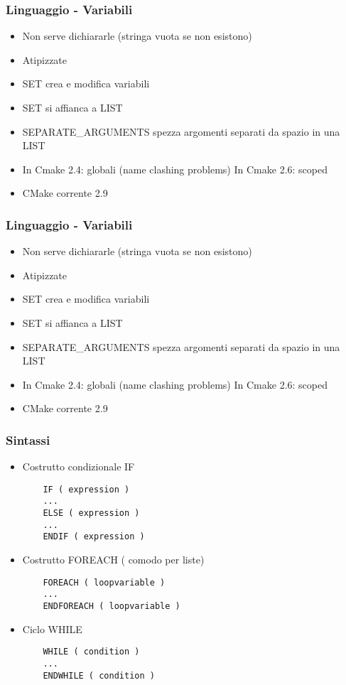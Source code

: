 \documentclass[12pt] {beamer}
\begin{document}
\begin{frame}
	\frametitle{Linguaggio - Variabili}
	\begin{itemize}
		\item Non serve dichiararle (stringa vuota se non esistono)
		\item Atipizzate
		\item SET crea e modifica variabili
		\item SET si affianca a LIST
		\item SEPARATE\_ARGUMENTS spezza argomenti separati da spazio in una LIST
		\item In Cmake 2.4: globali (name clashing problems)  In Cmake 2.6: scoped
		\item CMake corrente 2.9
\end{itemize}
\end{frame}

\begin{frame}
	\frametitle{Linguaggio - Variabili}
	\begin{itemize}
		\item Non serve dichiararle (stringa vuota se non esistono)
		\item Atipizzate
		\item SET crea e modifica variabili
		\item SET si affianca a LIST
		\item SEPARATE\_ARGUMENTS spezza argomenti separati da spazio in una LIST
		\item In Cmake 2.4: globali (name clashing problems)  In Cmake 2.6: scoped
		\item CMake corrente 2.9
\end{itemize}
\end{frame}


\begin{frame}[fragile]
	\frametitle{Sintassi}
\begin{itemize}
 \item Costrutto condizionale IF
	\begin{verbatim}
	IF ( expression )
	...
	ELSE ( expression )
	...
	ENDIF ( expression )
	\end{verbatim}
\item Costrutto FOREACH ( comodo per liste)
	\begin{verbatim}
	FOREACH ( loopvariable )
	...
	ENDFOREACH ( loopvariable )
	\end{verbatim}
\item Ciclo WHILE
	\begin{verbatim}
	WHILE ( condition )
	...
	ENDWHILE ( condition )
	\end{verbatim}
\end{itemize}
\end{frame}
\end{document}
